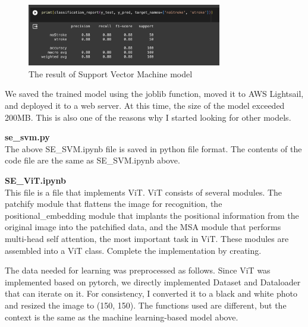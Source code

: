 \begin{figure}[H]
    \centering
    \includegraphics[width=8.5cm]{images/svm_result.png}
    \caption{The result of Support Vector Machine model}
    \label{fig:enter-label}
\end{figure}


We saved the trained model using the joblib function, moved it to AWS Lightsail, and deployed it to a web server. At this time, the size of the model exceeded 200MB. This is also one of the reasons why I started looking for other models.


\textbf{se\_svm.py} \\
The above SE\_SVM.ipynb file is saved in python file format. The contents of the code file are the same as SE\_SVM.ipynb above.


\textbf{SE\_ViT.ipynb} \\
This file is a file that implements ViT. ViT consists of several modules. The patchify module that flattens the image for recognition, the positional\_embedding module that implants the positional information from the original image into the patchified data, and the MSA module that performs multi-head self attention, the most important task in ViT. These modules are assembled into a ViT class. Complete the implementation by creating.

The data needed for learning was preprocessed as follows. Since ViT was implemented based on pytorch, we directly implemented Dataset and Dataloader that can iterate on it. For consistency, I converted it to a black and white photo and resized the image to (150, 150). The functions used are different, but the context is the same as the machine learning-based model above.

